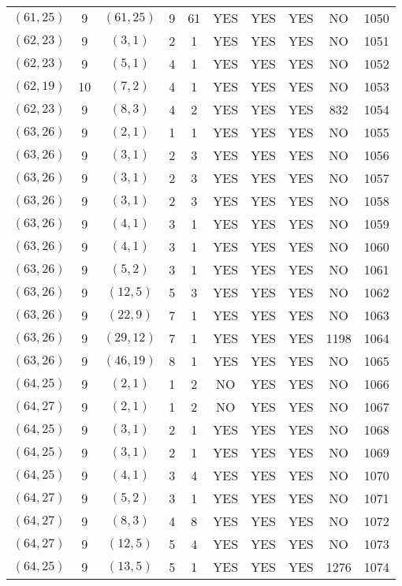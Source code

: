 \begin{longtable}{|c|c|c|c|c|c|c|c|c|c|}
$(61, 25)$ & 9 & $(61, 25)$ & 9 & 61 & YES & YES & YES & NO & 1050\\
$(62, 23)$ & 9 & $(3, 1)$ & 2 & 1 & YES & YES & YES & NO & 1051\\
$(62, 23)$ & 9 & $(5, 1)$ & 4 & 1 & YES & YES & YES & NO & 1052\\
$(62, 19)$ & 10 & $(7, 2)$ & 4 & 1 & YES & YES & YES & NO & 1053\\
$(62, 23)$ & 9 & $(8, 3)$ & 4 & 2 & YES & YES & YES & 832 & 1054\\
$(63, 26)$ & 9 & $(2, 1)$ & 1 & 1 & YES & YES & YES & NO & 1055\\
$(63, 26)$ & 9 & $(3, 1)$ & 2 & 3 & YES & YES & YES & NO & 1056\\
$(63, 26)$ & 9 & $(3, 1)$ & 2 & 3 & YES & YES & YES & NO & 1057\\
$(63, 26)$ & 9 & $(3, 1)$ & 2 & 3 & YES & YES & YES & NO & 1058\\
$(63, 26)$ & 9 & $(4, 1)$ & 3 & 1 & YES & YES & YES & NO & 1059\\
$(63, 26)$ & 9 & $(4, 1)$ & 3 & 1 & YES & YES & YES & NO & 1060\\
$(63, 26)$ & 9 & $(5, 2)$ & 3 & 1 & YES & YES & YES & NO & 1061\\
$(63, 26)$ & 9 & $(12, 5)$ & 5 & 3 & YES & YES & YES & NO & 1062\\
$(63, 26)$ & 9 & $(22, 9)$ & 7 & 1 & YES & YES & YES & NO & 1063\\
$(63, 26)$ & 9 & $(29, 12)$ & 7 & 1 & YES & YES & YES & 1198 & 1064\\
$(63, 26)$ & 9 & $(46, 19)$ & 8 & 1 & YES & YES & YES & NO & 1065\\
$(64, 25)$ & 9 & $(2, 1)$ & 1 & 2 & NO & YES & YES & NO & 1066\\
$(64, 27)$ & 9 & $(2, 1)$ & 1 & 2 & NO & YES & YES & NO & 1067\\
$(64, 25)$ & 9 & $(3, 1)$ & 2 & 1 & YES & YES & YES & NO & 1068\\
$(64, 25)$ & 9 & $(3, 1)$ & 2 & 1 & YES & YES & YES & NO & 1069\\
$(64, 25)$ & 9 & $(4, 1)$ & 3 & 4 & YES & YES & YES & NO & 1070\\
$(64, 27)$ & 9 & $(5, 2)$ & 3 & 1 & YES & YES & YES & NO & 1071\\
$(64, 27)$ & 9 & $(8, 3)$ & 4 & 8 & YES & YES & YES & NO & 1072\\
$(64, 27)$ & 9 & $(12, 5)$ & 5 & 4 & YES & YES & YES & NO & 1073\\
$(64, 25)$ & 9 & $(13, 5)$ & 5 & 1 & YES & YES & YES & 1276 & 1074\\

\end{longtable}
